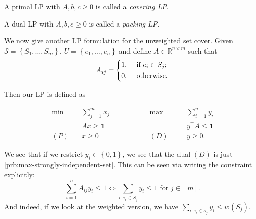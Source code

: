 \begin{definition}[Covering LP]\label{def:covering-LP}
	A primal LP with \(A, b, c \geq 0\) is called a \emph{covering LP}.
\end{definition}

\begin{definition}[Packing LP]\label{def:packing-LP}
	A dual LP with \(A, b, c \geq 0\) is called a \emph{packing LP}.
\end{definition}

We now give another LP formulation for the unweighted \hyperref[prb:set-cover]{set cover}. Given \(\mathcal{S} = \left\{ S_1, \dots , S_m  \right\} \), \(U = \left\{ e_1, \dots , e_n  \right\} \) and define \(A\in \mathbb{R} ^{n\times m}\) such that
\[
	A_{ij} = \begin{dcases}
		1, & \text{ if } e_i\in S_j ; \\
		0, & \text{ otherwise}.
	\end{dcases}
\]

Then our LP is defined as

\[
	\begin{alignedat}{5}
		\min~    & \sum_{j=1}^{m} x_j\qquad\qquad &  & \max ~   &  & \sum_{i =1}^{n} y_i  \\
		         & Ax \geq \bm{1}                 &  &          &  & y^{\top}A\leq \bm{1} \\
		(P)\quad & x\geq  0                       &  & (D)\quad &  & y \geq 0.
	\end{alignedat}
\]

We see that if we restrict \(y_i\in \left\{ 0, 1 \right\} \), we see that the dual \((D)\) is just \autoref{prb:max-strongly-independent-set}. This can be seen via writing the constraint explicitly:
\[
	\sum_{i=1}^{n} A_{ij} y_{i} \leq 1 \iff \sum_{i\colon e_i\in S_j} y_{i} \leq 1 \text{ for } j\in[m].
\]
And indeed, if we look at the weighted version, we have \(\sum_{i\colon e_i\in s_j} y_{i} \leq w(S_j)\).

